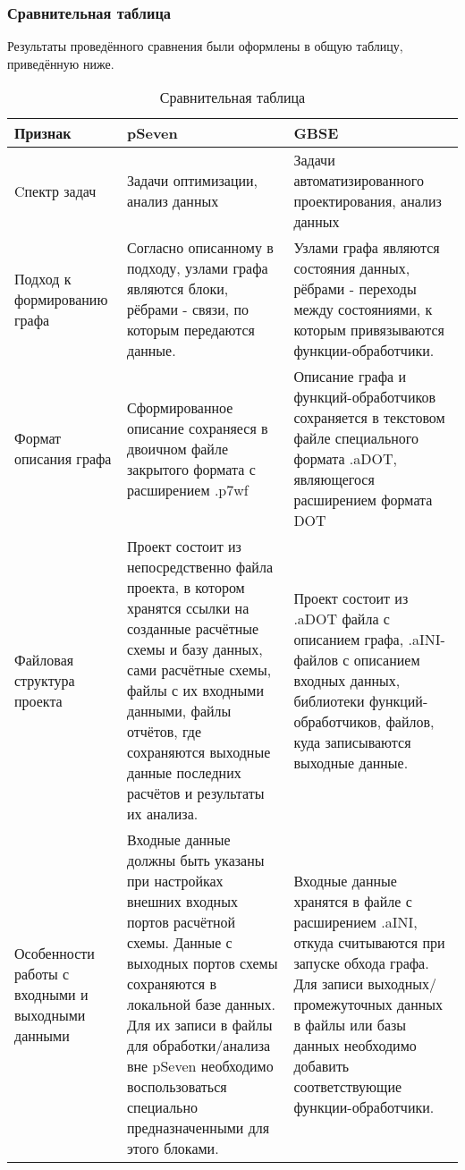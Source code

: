\subsubsection{Сравнительная таблица}
Результаты проведённого сравнения были оформлены в общую таблицу, приведённую ниже.
\noindent\begin{longtable}{|p{3.5cm}|p{6.625cm}|p{6.625cm}|}
    \caption{Сравнительная таблица \label{thetable}} \\
    \hline
    \textbf{Признак} & \textbf{pSeven} & \textbf{GBSE} \\
    \hline
    Cпектр задач & Задачи оптимизации, анализ данных & Задачи автоматизированного проектирования, анализ данных \\
    \hline
    Подход к формированию графа & Согласно описанному в \cite{Nazarenko2015} подходу, узлами графа являются блоки, рёбрами - связи, по которым передаются данные. & Узлами графа являются состояния данных, рёбрами - переходы между состояниями, к которым привязываются функции-обработчики. \cite{SokolovPershin2018} \\
    \hline
    Формат описания графа & Сформированное описание сохраняеся в двоичном файле закрытого формата с расширением \textsf{.p7wf} & Описание графа и функций-обработчиков сохраняется в текстовом файле специального формата \textsf{.aDOT}, являющегося расширением формата DOT\cite{SokolovPershin2018} \\
    \hline
    Файловая структура проекта & Проект состоит из непосредственно файла проекта, в котором хранятся ссылки на созданные расчётные схемы и базу данных, сами расчётные схемы, файлы с их входными данными, файлы отчётов, где сохраняются выходные данные последних расчётов и результаты их анализа. & Проект состоит из \textsf{.aDOT} файла с описанием графа, \textsf{.aINI}-файлов с описанием входных данных, библиотеки функций-обработчиков, файлов, куда записываются выходные данные. \\
    \hline
    Особенности работы с входными и выходными данными & Входные данные должны быть указаны при настройках внешних входных портов расчётной схемы. Данные с выходных портов схемы сохраняются в локальной базе данных. Для их записи в файлы для обработки/анализа вне pSeven необходимо воспользоваться специально предназначенными для этого блоками. & Входные данные хранятся в файле с расширением .aINI, откуда считываются при запуске обхода графа\cite{SokolovPershin2017}. Для записи выходных/промежуточных данных в файлы или базы данных необходимо добавить соответствующие функции-обработчики. \\

\end{longtable}
